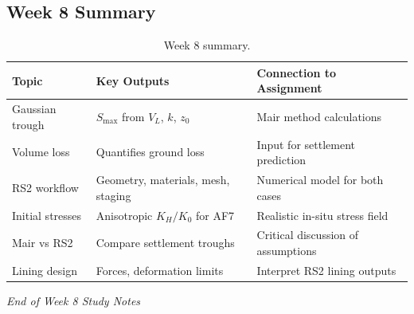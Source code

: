 \documentclass[a4paper,12pt]{article}
\begin{document}
\subsection{Week 8 Summary}
\begin{table}[h!]
\centering
\begin{tabularx}{\textwidth}{l X X}
\toprule
\textbf{Topic} & \textbf{Key Outputs} & \textbf{Connection to Assignment} \\
\midrule
Gaussian trough & $S_{\text{max}}$ from $V_L$, $k$, $z_0$ & Mair method calculations \\
Volume loss & Quantifies ground loss & Input for settlement prediction \\
RS2 workflow & Geometry, materials, mesh, staging & Numerical model for both cases \\
Initial stresses & Anisotropic $K_H/K_0$ for AF7 & Realistic in-situ stress field \\
Mair vs RS2 & Compare settlement troughs & Critical discussion of assumptions \\
Lining design & Forces, deformation limits & Interpret RS2 lining outputs \\
\bottomrule
\end{tabularx}
\caption{Week 8 summary.}
\label{tab:summary}
\end{table}

\vspace{1cm}
\noindent\textit{End of Week 8 Study Notes}
\end{document}
